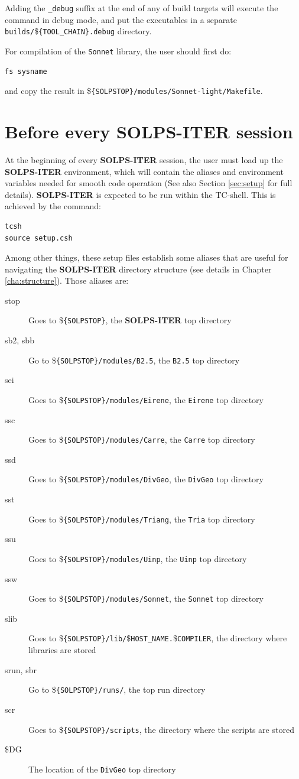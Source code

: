 \documentclass[a4paper,10pt]{report}
\newcommand\SOLPSITER{{\bf SOLPS-ITER} }
\begin{document}
Adding the {\tt \_debug} suffix at the end of any of build targets will execute the command
in debug mode, and put the executables in a separate
{\tt builds/}\${\tt \{TOOL\_CHAIN\}.debug} directory.

For compilation of the {\tt Sonnet} library, the user should first do:
\begin{verbatim}
fs sysname
\end{verbatim}
and copy the result in \${\tt \{SOLPSTOP\}/modules/Sonnet-light/Makefile}.

\section{Before every \SOLPSITER session}

At the beginning of every \SOLPSITER session, the user must load up the \SOLPSITER
environment, which will contain the aliases and environment variables needed for
smooth code operation (See also Section \ref{sec:setup} for full details).
\SOLPSITER is expected to be run within the TC-shell. This is achieved by the command:
\begin{verbatim}
tcsh
source setup.csh
\end{verbatim}

Among other things, these setup files establish some aliases that are useful for navigating the \SOLPSITER directory structure (see details in Chapter \ref{cha:structure}). Those aliases are:
\begin{description}
  \item[stop] Goes to \${\tt \{SOLPSTOP\}}, the \SOLPSITER top directory
  \item[sb2, sbb] Go to \${\tt \{SOLPSTOP\}/modules/B2.5}, the {\tt B2.5} top directory
  \item[sei] Goes to \${\tt \{SOLPSTOP\}/modules/Eirene}, the {\tt Eirene} top directory
  \item[ssc] Goes to \${\tt \{SOLPSTOP\}/modules/Carre}, the {\tt Carre} top directory
  \item[ssd] Goes to \${\tt \{SOLPSTOP\}/modules/DivGeo}, the {\tt DivGeo} top directory
  \item[sst] Goes to \${\tt \{SOLPSTOP\}/modules/Triang}, the {\tt Tria} top directory
  \item[ssu] Goes to \${\tt \{SOLPSTOP\}/modules/Uinp}, the {\tt Uinp} top directory
  \item[ssw] Goes to \${\tt \{SOLPSTOP\}/modules/Sonnet}, the {\tt Sonnet} top directory
  \item[slib] Goes to \${\tt \{SOLPSTOP\}/lib/}\${\tt {HOST\_NAME}.}\${\tt {COMPILER}}, the directory where libraries are stored
  \item[srun, sbr] Go to \${\tt \{SOLPSTOP\}/runs/}, the top run directory
  \item[scr] Goes to \${\tt \{SOLPSTOP\}/scripts}, the directory where the scripts are stored
  \item[\$DG] The location of the {\tt DivGeo} top directory
\end{description}
\end{document}
